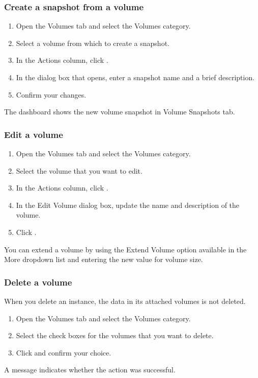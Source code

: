\subsubsection{Create a snapshot from a
  volume}\label{create-a-snapshot-from-a-volume}
\begin{enumerate}
\item Open the Volumes tab and select the Volumes category.
\item Select a volume from which to create a snapshot.
\item In the Actions column, click .
\item In the dialog box that opens, enter a snapshot name and a brief
  description.
\item Confirm your changes.
\end{enumerate}

The dashboard shows the new volume snapshot in Volume Snapshots tab.

\subsubsection{Edit a volume}\label{edit-a-volume}
\begin{enumerate}
\def\labelenumi{\arabic{enumi}.}
\item Open the Volumes tab and select the Volumes category.
\item Select the volume that you want to edit.
\item In the Actions column, click .
\item In the Edit Volume dialog box, update the name and description
  of the volume.
\item Click .
\end{enumerate}

 You can extend a volume by using the Extend Volume
option available in the More dropdown list and entering the new value
for volume size.

\subsubsection{Delete a volume}\label{delete-a-volume}
When you delete an instance, the data in its attached volumes is not
deleted.

\begin{enumerate}
\item Open the Volumes tab and select the Volumes category.
\item Select the check boxes for the volumes that you want to delete.
\item Click  and confirm your choice.
\end{enumerate}

A message indicates whether the action was successful.


